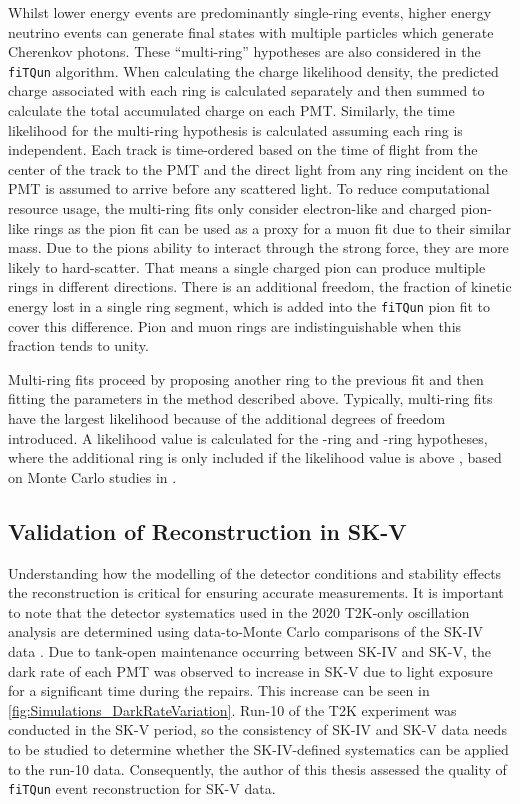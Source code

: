 Whilst lower energy events are predominantly single-ring events, higher energy neutrino events can generate final states with multiple particles which generate Cherenkov photons. These ``multi-ring'' hypotheses are also considered in the \texttt{fiTQun} algorithm. When calculating the charge likelihood density, the predicted charge associated with each ring is calculated separately and then summed to calculate the total accumulated charge on each PMT. Similarly, the time likelihood for the multi-ring hypothesis is calculated assuming each ring is independent. Each track is time-ordered based on the time of flight from the center of the track to the PMT and the direct light from any ring incident on the PMT is assumed to arrive before any scattered light. To reduce computational resource usage, the multi-ring fits only consider electron-like and charged pion-like rings as the pion fit can be used as a proxy for a muon fit due to their similar mass. Due to the pions ability to interact through the strong force, they are more likely to hard-scatter. That means a single charged pion can produce multiple rings in different directions. There is an additional freedom, the fraction of kinetic energy lost in a single ring segment, which is added into the \texttt{fiTQun} pion fit to cover this difference. Pion and muon rings are indistinguishable when this fraction tends to unity.

Multi-ring fits proceed by proposing another ring to the previous fit and then fitting the parameters in the method described above. Typically, multi-ring fits have the largest likelihood because of the additional degrees of freedom introduced. A likelihood value is calculated for the -ring and -ring hypotheses, where the additional ring is only included if the likelihood value is above , based on Monte Carlo studies in \cite{Tobayama:2016dsi}.

\subsection{Validation of Reconstruction in SK-V}
\label{sec:Simulation_ReconstructionInSKV}

Understanding how the modelling of the detector conditions and stability effects the reconstruction is critical for ensuring accurate measurements. It is important to note that the detector systematics used in the 2020 T2K-only \cite{Dunne2020-uf} oscillation analysis are determined using data-to-Monte Carlo comparisons of the SK-IV data \cite{t2k_tn_399}. Due to tank-open maintenance occurring between SK-IV and SK-V, the dark rate of each PMT was observed to increase in SK-V due to light exposure for a significant time during the repairs. This increase can be seen in \autoref{fig:Simulations_DarkRateVariation}. Run-10 of the T2K experiment was conducted in the SK-V period, so the consistency of SK-IV and SK-V data needs to be studied to determine whether the SK-IV-defined systematics can be applied to the run-10 data. Consequently, the author of this thesis assessed the quality of \texttt{fiTQun} event reconstruction for SK-V data.

